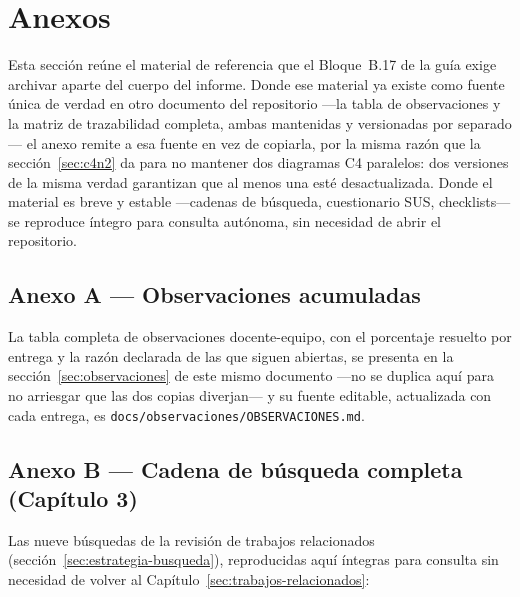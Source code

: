 \documentclass[11pt,a4paper]{article}
\newcommand{\ruta}[1]{\texttt{\footnotesize #1}}
\begin{document}
\newpage



\newpage
\section*{Anexos}
\label{sec:anexos}

Esta sección reúne el material de referencia que el Bloque~B.17 de la
guía exige archivar aparte del cuerpo del informe. Donde ese material
ya existe como fuente única de verdad en otro documento del
repositorio —la tabla de observaciones y la matriz de trazabilidad
completa, ambas mantenidas y versionadas por separado— el anexo remite
a esa fuente en vez de copiarla, por la misma razón que
la sección~\ref{sec:c4n2} da para no mantener dos diagramas C4
paralelos: dos versiones de la misma verdad garantizan que al menos
una esté desactualizada. Donde el material es breve y estable
—cadenas de búsqueda, cuestionario SUS, checklists— se reproduce
íntegro para consulta autónoma, sin necesidad de abrir el repositorio.

\subsection*{Anexo A --- Observaciones acumuladas}

La tabla completa de observaciones docente-equipo, con el porcentaje
resuelto por entrega y la razón declarada de las que siguen abiertas,
se presenta en la sección~\ref{sec:observaciones} de este mismo
documento —no se duplica aquí para no arriesgar que las dos copias
diverjan— y su fuente editable, actualizada con cada entrega, es
\ruta{docs/observaciones/OBSERVACIONES.md}.

\subsection*{Anexo B --- Cadena de búsqueda completa (Capítulo 3)}

Las nueve búsquedas de la revisión de trabajos relacionados
(sección~\ref{sec:estrategia-busqueda}), reproducidas aquí íntegras
para consulta sin necesidad de volver al Capítulo~\ref{sec:trabajos-relacionados}:
\end{document}
